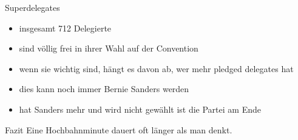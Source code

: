 \documentclass{beamer}
\begin{document}
\begin{frame}{Superdelegates}
  \begin{itemize}
    \item insgesamt 712 Delegierte
    \item sind völlig frei in ihrer Wahl auf der Convention
    \item wenn sie wichtig sind, hängt es davon ab, wer mehr pledged delegates hat
    \item dies kann noch immer Bernie Sanders werden
    \item hat Sanders mehr und wird nicht gewählt ist die Partei am Ende
  \end{itemize}
\end{frame}

\begin{frame}{Fazit}
  \centering
  Eine Hochbahnminute dauert oft länger als man denkt.
\end{frame}
\end{document}
